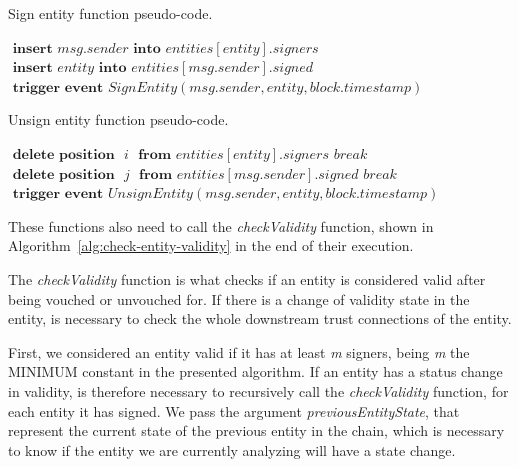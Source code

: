 \begin{algorithm}
  \caption{Sign entity function pseudo-code.}
  \label{alg:sign-entity}
  \begin{algorithmic}[1]
      \State $\textbf{ insert } msg.sender \textbf{ into } entities[entity].signers$
      \State $\textbf{ insert } entity \textbf{ into } entities[msg.sender].signed$
      \State $\textbf{ trigger event } SignEntity(msg.sender, entity, block.timestamp)$
      \State {}
    \EndFunction
  \end{algorithmic}
\end{algorithm}

\begin{algorithm}
  \caption{Unsign entity function pseudo-code.}
  \label{alg:unsign-entity}
  \begin{algorithmic}[1]
          \State $\textbf{ delete position } \textit{ i } \textbf{ from } entities[entity].signers$
          \State $break$
        \EndIf
      \EndFor
      \State
          \State $\textbf{ delete position } \textit{ j }\textbf{ from } entities[msg.sender].signed$
          \State $break$
        \EndIf
      \EndFor
      \State
      \State $\textbf{ trigger event } UnsignEntity(msg.sender, entity, block.timestamp)$
      \State
      \State {}
    \EndFunction
  \end{algorithmic}
\end{algorithm}

These functions also need to call the \textit{checkValidity} function, shown in Algorithm~\ref{alg:check-entity-validity} in the end of their execution.

The \textit{checkValidity} function is what checks if an entity is considered valid after being vouched or unvouched for.
If there is a change of validity state in the entity, is necessary to check the whole downstream trust connections of the entity.

First, we considered an entity valid if it has at least \textit{m} signers, being \textit{m} the MINIMUM constant in the presented algorithm.
If an entity has a status change in validity, is therefore necessary to recursively call the \textit{checkValidity} function, for each entity it has signed.
We pass the argument \textit{previousEntityState}, that represent the current state of the previous entity in the chain, which is necessary to know if the entity we are currently analyzing will have a state change.

